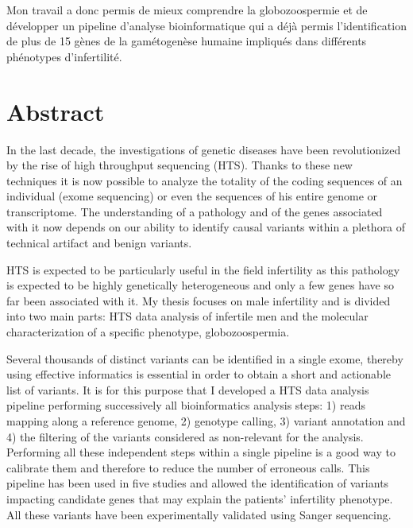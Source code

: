 \documentclass[12pt,a4paper,twoside]{ugathesis}
\theoremstyle{definition}
\theoremstyle{definition}
\theoremstyle{definition}
\theoremstyle{remark}
\begin{document}
Mon travail a donc permis de mieux comprendre la globozoospermie et de
développer un pipeline d'analyse bioinformatique qui a déjà permis
l'identification de plus de 15 gènes de la gamétogenèse humaine
impliqués dans différents phénotypes d'infertilité.

\newpage

\chapter*{Abstract}\label{abstract}

\newpage

In the last decade, the investigations of genetic diseases have been
revolutionized by the rise of high throughput sequencing (HTS). Thanks
to these new techniques it is now possible to analyze the totality of
the coding sequences of an individual (exome sequencing) or even the
sequences of his entire genome or transcriptome. The understanding of a
pathology and of the genes associated with it now depends on our ability
to identify causal variants within a plethora of technical artifact and
benign variants.

HTS is expected to be particularly useful in the field infertility as
this pathology is expected to be highly genetically heterogeneous and
only a few genes have so far been associated with it. My thesis focuses
on male infertility and is divided into two main parts: HTS data
analysis of infertile men and the molecular characterization of a
specific phenotype, globozoospermia.

Several thousands of distinct variants can be identified in a single
exome, thereby using effective informatics is essential in order to
obtain a short and actionable list of variants. It is for this purpose
that I developed a HTS data analysis pipeline performing successively
all bioinformatics analysis steps: 1) reads mapping along a reference
genome, 2) genotype calling, 3) variant annotation and 4) the filtering
of the variants considered as non-relevant for the analysis. Performing
all these independent steps within a single pipeline is a good way to
calibrate them and therefore to reduce the number of erroneous calls.
This pipeline has been used in five studies and allowed the
identification of variants impacting candidate genes that may explain
the patients' infertility phenotype. All these variants have been
experimentally validated using Sanger sequencing.
\end{document}

